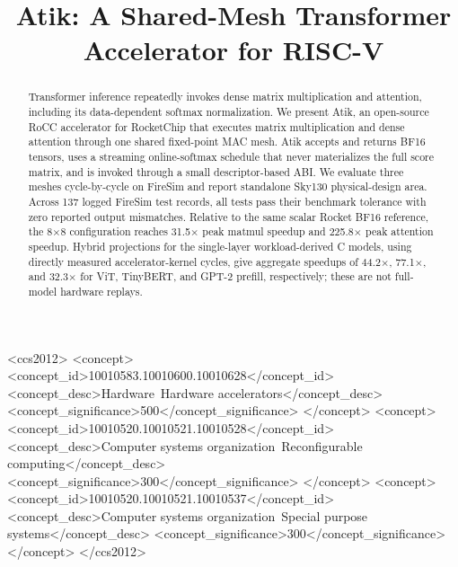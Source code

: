 \documentclass[sigconf,nonacm]{acmart}
\begin{document}
\title{Atik: A Shared-Mesh Transformer Accelerator for RISC-V}



\begin{abstract}
Transformer inference repeatedly invokes dense matrix multiplication and
attention, including its data-dependent softmax normalization. We present
Atik, an open-source RoCC accelerator for RocketChip that executes matrix
multiplication and dense attention through one shared fixed-point MAC mesh.
Atik accepts and returns BF16 tensors, uses a streaming online-softmax schedule
that never materializes the full score matrix, and is invoked through a small
descriptor-based ABI. We evaluate three meshes cycle-by-cycle on FireSim and
report standalone Sky130 physical-design area. Across 137 logged FireSim test
records, all tests pass their benchmark tolerance with zero reported output
mismatches. Relative to the same scalar Rocket BF16 reference, the 8$\times$8
configuration reaches 31.5$\times$ peak matmul speedup and 225.8$\times$ peak
attention speedup. Hybrid projections for the single-layer workload-derived C
models, using directly measured accelerator-kernel cycles, give aggregate
speedups of 44.2$\times$, 77.1$\times$, and 32.3$\times$ for ViT, TinyBERT,
and GPT-2 prefill, respectively; these are not full-model hardware replays.
\end{abstract}

\begin{CCSXML}
<ccs2012>
 <concept>
  <concept_id>10010583.10010600.10010628</concept_id>
  <concept_desc>Hardware~Hardware accelerators</concept_desc>
  <concept_significance>500</concept_significance>
 </concept>
 <concept>
  <concept_id>10010520.10010521.10010528</concept_id>
  <concept_desc>Computer systems organization~Reconfigurable computing</concept_desc>
  <concept_significance>300</concept_significance>
 </concept>
 <concept>
  <concept_id>10010520.10010521.10010537</concept_id>
  <concept_desc>Computer systems organization~Special purpose systems</concept_desc>
  <concept_significance>300</concept_significance>
 </concept>
</ccs2012>
\end{CCSXML}



\maketitle
\pagestyle{standardpagestyle}
\end{document}

